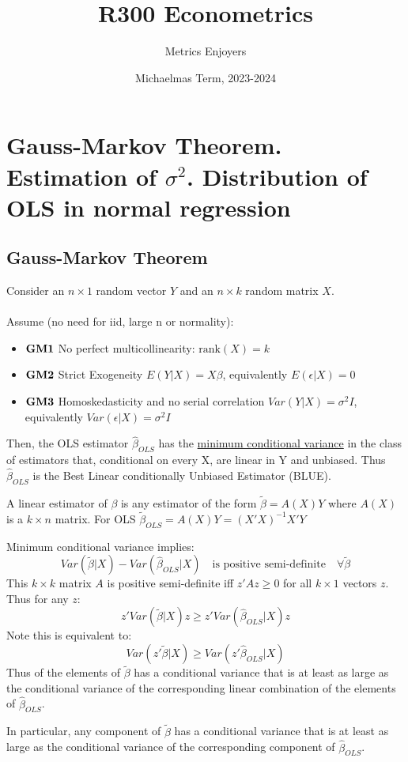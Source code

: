 \documentclass[DIV=14,titlepage=false]{scrreprt}
\title{%
R300 Econometrics}
\author{Metrics Enjoyers}
\date{Michaelmas Term, 2023-2024}
\begin{document}
\chapter{Gauss-Markov Theorem. Estimation of \(\sigma^2\). Distribution of OLS in normal regression}
\section{Gauss-Markov Theorem}
\begin{theorem}Consider an \(n\times1\) random vector \(Y\) and an \(n\times k\) random matrix \(X\).
   \\  \\ Assume (no need for iid, large n or normality): 
\begin{itemize}
    \item \(\bold{GM1}\) No perfect multicollinearity: \(\text{rank}(X) = k\)
    \item \(\bold{GM2}\) Strict Exogeneity \(E(Y|X)=X\beta\), equivalently \(E(\epsilon|X)=0\)
    \item \(\bold{GM3}\) Homoskedasticity and no serial correlation \(Var(Y|X)=\sigma^2 I\), 
    \\ equivalently \(Var(\epsilon|X)=\sigma^2 I\)
\end{itemize}
    Then, the OLS estimator \(\hat{\beta}_{OLS}\) has the \underline{minimum conditional variance} in the class of estimators that, conditional on every X, are linear in Y and unbiased.
    Thus \(\hat{\beta}_{OLS}\) is the Best Linear conditionally Unbiased Estimator (BLUE).
\end{theorem}

A linear estimator of \(\beta\) is any estimator of the form \(\tilde{\beta}=A(X)Y\) where \(A(X)\) is a \(k\times n\) matrix.
For OLS \(\tilde{\beta}_{OLS}=A(X)Y=(X'X)^{-1}X'Y\)

\begin{definition}
    Minimum conditional variance implies:
    \[Var(\tilde{\beta}|X) - Var(\hat{\beta}_{OLS}|X) \quad \text{is positive semi-definite} \quad \forall \tilde{\beta}\]
    This \(k\times k\) matrix \(A\) is positive semi-definite iff \(z'Az\geq0\) for all \(k\times1\) vectors \(z\).
    Thus for any \(z\): \[z'Var(\tilde{\beta}|X)z\geq z'Var(\hat{\beta}_{OLS}|X)z\]
    Note this is equivalent to: \[Var(z'\tilde{\beta}|X) \geq Var(z'\hat{\beta}_{OLS}|X)\]
    Thus \underline{} of the elements of \(\tilde{\beta}\) has a conditional variance that is at least as large as the conditional variance of the corresponding linear combination of the elements of \(\hat{\beta}_{OLS}\). 
    
    In particular, any component of \(\tilde{\beta}\) has a conditional variance that is at least as large as the conditional variance of the corresponding component of \(\hat{\beta}_{OLS}\).
\end{definition}
\end{document}
